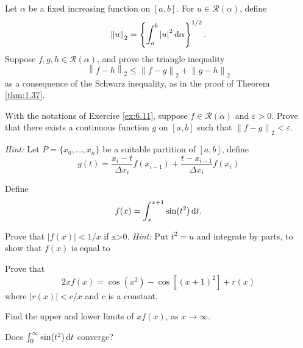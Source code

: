 \begin{myExercise}
    \label{ex:6.11}
    Let $\alpha$ be a fixed increasing function on $[a, b]$. 
    For $u \in \mathscr{R}(\alpha)$, define
    \begin{equation*}
        \left\| u \right\|_2 = \left\{ \int_a^b \left| u \right|^2 \d \alpha \right\}^{1/2} .
    \end{equation*}
    Suppose $f, g, h \in \mathscr{R}(\alpha)$, and prove the triangle inequality
    \begin{equation*}
        \left\| f-h \right\|_2 \leq
        \left\| f-g \right\|_2 +
        \left\| g-h \right\|_2 
    \end{equation*}
    as a consequence of the Schwarz inequality, as in the proof of Theorem \ref{thm:1.37}.
\end{myExercise}


\begin{myExercise}
    \label{ex:6.12}
    With the notations of Exercise \ref{ex:6.11}, 
    suppose $f \in \mathscr{R}(\alpha)$ and $\varepsilon > 0$. 
    Prove that there exists a continuous function $g$ on $[a, b]$ such that $\left\| f-g \right\|_2 < \varepsilon$.

    \emph{Hint:} Let $P = \{x_0,...,x_n\}$ be a suitable partition of $[a, b]$, define
    \begin{equation*}
        g(t) = 
        \frac{x_i-t}{\Delta x_i} f(x_{i-1}) +
        \frac{t-x_{i-1}}{\Delta x_i} f(x_{i})
    \end{equation*}
\end{myExercise}


\begin{myExercise}
    \label{ex:6.13}
    Define 
    \begin{equation*}
        f(x) = \int_{x}^{x+1} \sin (t^2) \d t.
    \end{equation*}
    \begin{asparaenum}[(a)]
        \item Prove that $\left| f(x) \right| < 1/x$ if x>0.
        \emph{Hint:} Put $t^2 = u$ and integrate by parts, to show that $f(x)$ is equal to 
        \begin{equation*}
            
        \end{equation*}
        \item Prove that 
        \begin{equation*}
            2xf(x) = \cos(x^2) - \cos [(x+1)^2] + r(x)
        \end{equation*}
        where $\left| r(x) \right| < c/x$ and $c$ is a constant.
        \item Find the upper and lower limits of $x f(x)$, as $x \rightarrow \infty$.
        \item Does $\int_{0}^{\infty} \sin (t^2) \d t$ converge?
    \end{asparaenum}
\end{myExercise}


